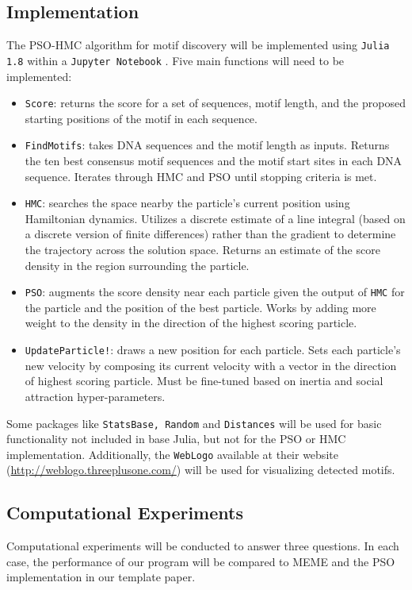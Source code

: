 \documentclass{article}
\begin{document}
\subsection{Implementation}
The PSO-HMC algorithm for motif discovery will be implemented using \texttt{Julia 1.8} \cite{Julia-2017} within a  \texttt{Jupyter Notebook}  \cite{Kluyver2016jupyter}. Five main functions will need to be implemented:
\begin{itemize}
	\item \texttt{Score}: returns the score for a set of sequences, motif length, and the proposed starting positions of the motif in each sequence.
	\item \texttt{FindMotifs}: takes DNA sequences and the motif length as inputs. Returns the ten best consensus motif sequences and the motif start sites in each DNA sequence. Iterates through HMC and PSO until stopping criteria is met.
	\item \texttt{HMC}: searches the space nearby the particle's current position using Hamiltonian dynamics. Utilizes a discrete estimate of a line integral (based on a discrete version of finite differences) rather than the gradient to determine the trajectory across the solution space. Returns an estimate of the score density in the region surrounding the particle.
	\item \texttt{PSO}: augments the score density near each particle given the output of \texttt{HMC} for the particle and the position of the best particle. Works by adding more weight to the density in the direction of the highest scoring particle.
	\item \texttt{UpdateParticle!}: draws a new position for each particle. Sets each particle's new velocity by composing its current velocity with a vector in the direction of highest scoring particle. Must be fine-tuned based on inertia and social attraction hyper-parameters.
\end{itemize}
  Some packages like \texttt{StatsBase, Random} and \texttt{Distances} will be used for basic functionality not included in base Julia, but not for the PSO or HMC implementation. Additionally, the \texttt{WebLogo} available at their website (\url{http://weblogo.threeplusone.com/}) will be used for visualizing detected motifs.
\subsection{Computational Experiments} 
  Computational experiments will be conducted to answer three questions. In each case, the performance of our program will be compared to MEME and the PSO implementation in our template paper.
  
\end{document}
